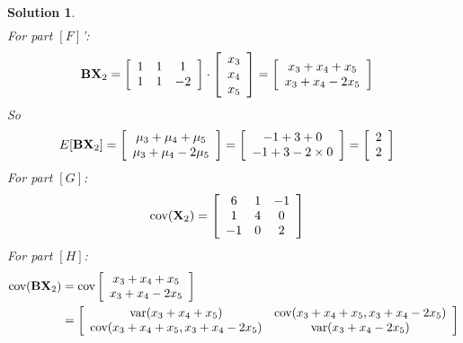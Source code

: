 \documentclass[11pt]{article}\usepackage[]{graphicx}\usepackage[]{color}
\newtheorem{sol}{Solution}
\begin{document}
\begin{sol}
\begin{align*}
	\end{align*}
	For part $[F]$':
	\begin{align*}
		{\bf B}{\bf X}_2 &= \left[\begin{array}{ccc} 1&1&1\\ 1&1&-2\end{array}\right]\cdot  \left[\begin{array}{c} x_3\\ x_4\\ x_5\end{array}\right] = \left[\begin{array}{c} x_3+ x_4 + x_5\\x_3 + x_4 - 2x_5 \end{array}\right]
	\end{align*}
	So 
	\begin{align*}
		E[{\bf B}{\bf X}_2]&= \left[\begin{array}{c} \mu_3+  \mu_4 +  \mu_5\\ \mu_3 +  \mu_4 - 2 \mu_5 \end{array}\right] =  \left[\begin{array}{c} -1 + 3 + 0\\ -1 + 3 - 2 \times 0 \end{array}\right]  =  \left[\begin{array}{c} 2\\ 2 \end{array}\right] 
	\end{align*}
	For part $[G]$:
	\begin{align*}
		\text{cov}({\bf X}_2) &= \left[\begin{array}{ccc} 6&1&-1\\ 1&4&0\\ -1&0&2\end{array}\right]
	\end{align*}
	For part $[H]$:
	\begin{align*}
		\text{cov}({\bf B}{\bf X}_2) &= \text{cov}\left[\begin{array}{c} x_3+ x_4 + x_5\\x_3 + x_4 - 2x_5 \end{array}\right]\\
		&= \left[\begin{array}{cc} \text{var}(x_3 + x_4 + x_5)&\text{cov}(x_3 + x_4 + x_5, x_3 + x_4 - 2x_5) \\ \text{cov}(x_3 + x_4 + x_5, x_3 + x_4 - 2x_5)& \text{var}(x_3 + x_4 - 2x_5)\end{array}\right]
	\end{align*}

\end{sol}
\end{document}
